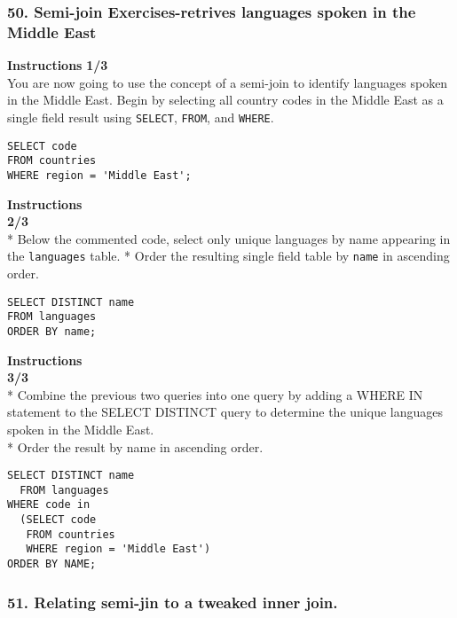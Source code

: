 \documentclass[
]{article}
\begin{document}
\hypertarget{semi-join-exercises-retrives-languages-spoken-in-the-middle-east}{%
\subsubsection{50. Semi-join Exercises-retrives languages spoken in the
Middle
East}\label{semi-join-exercises-retrives-languages-spoken-in-the-middle-east}}

\textbf{Instructions} \textbf{1/3}\\
You are now going to use the concept of a semi-join to identify
languages spoken in the Middle East. Begin by selecting all country
codes in the Middle East as a single field result using \texttt{SELECT},
\texttt{FROM}, and \texttt{WHERE}.

\begin{verbatim}
SELECT code
FROM countries
WHERE region = 'Middle East';
\end{verbatim}

\textbf{Instructions}\\
\textbf{2/3}\\
* Below the commented code, select only unique languages by name
appearing in the \texttt{languages} table. * Order the resulting single
field table by \texttt{name} in ascending order.

\begin{verbatim}
SELECT DISTINCT name
FROM languages
ORDER BY name;
\end{verbatim}

\textbf{Instructions}\\
\textbf{3/3}\\
* Combine the previous two queries into one query by adding a WHERE IN
statement to the SELECT DISTINCT query to determine the unique languages
spoken in the Middle East.\\
* Order the result by name in ascending order.

\begin{verbatim}
SELECT DISTINCT name
  FROM languages
WHERE code in
  (SELECT code
   FROM countries
   WHERE region = 'Middle East')
ORDER BY NAME;
\end{verbatim}

\hypertarget{relating-semi-jin-to-a-tweaked-inner-join.}{%
\subsubsection{51. Relating semi-jin to a tweaked inner
join.}\label{relating-semi-jin-to-a-tweaked-inner-join.}}
\end{document}
